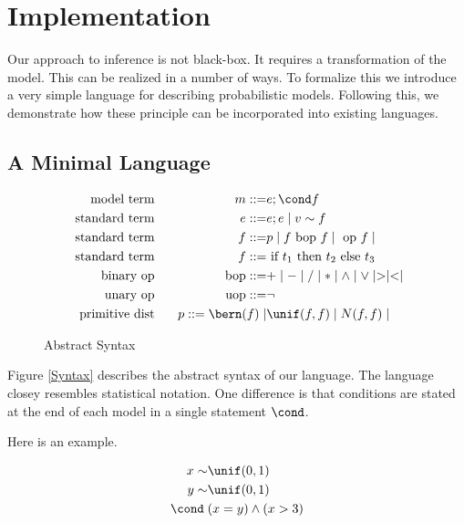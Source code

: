 \section{Implementation}\label{implement}

Our approach to inference is not black-box.
It requires a transformation of the model.
This can be realized in a number of ways.
To formalize this we introduce a very simple language for describing probabilistic models.
Following this, we demonstrate how these principle can be incorporated into existing languages.


\subsection{A Minimal Language}{\label{minilang}}


\begin{figure}[t]
	\begin{align*}
		\text { model term }  &  & \enspace m ::=               & e ; \cond f \\
		\text { standard term }  &  & \enspace e ::=               & e ; e \mid v \sim f\\
		\text { standard term }  &  & \enspace f ::=               & p \mid f \textrm{ bop }f \mid\textrm{ op } f \mid \\
		\text { standard term }  &  & \enspace f ::=               & \text{ if } t_1 \text{ then } t_2 \text{ else } t_3 \\
		\text { binary op }      &  & \enspace \textrm{bop} ::=    & + \mid - \mid / \mid * \mid \land \mid \lor \mid > \mid < \mid \\
		\text { unary op }       &  & \enspace \textrm{uop} ::=    & \lnot                                                          \\
		\text { primitive dist } &  & \enspace p ::= \bern(f) \mid & \unif(f, f) \mid N(f, f) \mid                                  \\
	\end{align*}
	\caption{Abstract Syntax}
	\label{syntax}
\end{figure}

Figure \ref{Syntax} describes the abstract syntax of our language.
The language closey resembles statistical notation.
One difference is that conditions are stated at the end of each model in a single statement $\cond$.

Here is an example.

\begin{align*}
	x \sim   & \unif(0, 1)           \\
	y \sim   & \unif(0, 1)           \\
	\cond \; & (x = y) \land (x > 3) \\
\end{align*}

